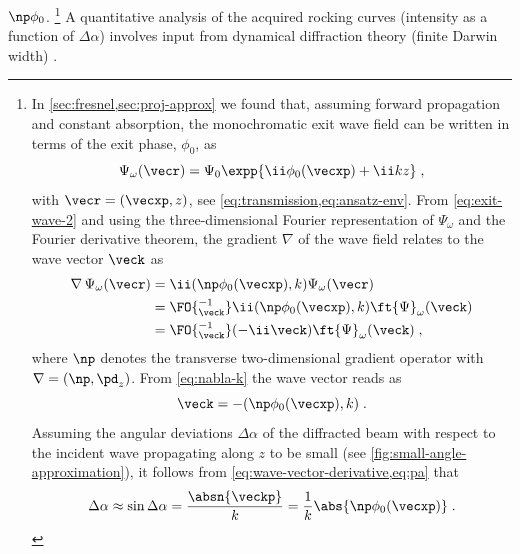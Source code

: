 \documentclass[
twoside,
openright,
titlepage,
numbers=noenddot,
headinclude,
fleqn,
a4paper,
footinclude=true,
cleardoublepage=empty,
abstractoff,
BCOR=5mm,
paper=a4,
fontsize=11pt,
british,ngerman,american,
]{scrreprt}
\begin{document}
$\np\phi_0$.  \footnote{ In \cref{sec:fresnel,sec:proj-approx} we
  found that, assuming forward propagation and constant absorption,
  the monochromatic exit wave field can be written in terms of the
  exit phase, $\phi_0$, as
\begin{equation}
  \label{eq:exit-wave-2} 
  \Psi_\omega(\vecr) = 
  \Psi_0\expp{\ii\phi_0(\vecxp)+\ii k z} \;,
\end{equation} 
with $\vecr=(\vecxp,z)$, see \cref{eq:transmission,eq:ansatz-env}.
From \cref{eq:exit-wave-2} and using the three-dimensional Fourier
representation of $\Psi_\omega$ and the Fourier derivative theorem,
the gradient $\nabla$ of the wave field relates to the wave vector
$\veck$ as
\begin{equation}
  \label{eq:nabla-k} 
  \begin{split}
    \nabla\,\Psi_\omega(\vecr) 
    & = \ii(\np\phi_0(\vecxp),k)\Psi_\omega(\vecr) 
    \\ & = \FO{^{-1}_\veck} \ii(\np\phi_0(\vecxp),k)
    \ft{\Psi}_\omega(\veck) 
    \\ & = \FO{^{-1}_\veck}(-\ii\veck)\ft{\Psi}_\omega(\veck) \;,
  \end{split}
\end{equation}
where $\np$ denotes the transverse two-dimensional gradient operator
with $\nabla=(\np,\pd_z)$.  From \cref{eq:nabla-k} the wave vector
reads as
\begin{equation}
  \label{eq:wave-vector-derivative}
  \veck =  -(\np\phi_0(\vecxp),k) \;.
\end{equation}
Assuming the angular deviations $\Delta\alpha$ of the diffracted beam
with respect to the incident wave propagating along $z$ to be
small (see \cref{fig:small-angle-approximation}), it follows from
\cref{eq:wave-vector-derivative,eq:pa} that
\begin{equation}
  \label{eq:small-angle-diffraction}
  \Delta\alpha \approx \sin\Delta\alpha 
  =\frac{\absn{\veckp}}{k} 
  = \frac{1}{k}\abs{\np\phi_0(\vecxp)} \;.
\end{equation}
} A quantitative analysis of the acquired rocking curves (intensity as
a function of $\Delta\alpha$) involves input from dynamical
diffraction theory (finite Darwin width)
\cite{Foerster1980,Davis1995,Bushuev1996,Luebbert2000,Nesterets2008}.
 
\end{document}
